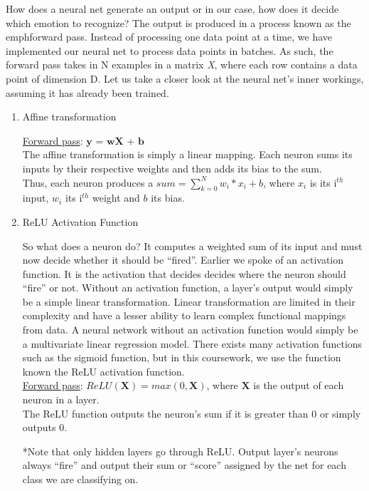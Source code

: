 How does a neural net generate an output or in our case, how does it decide which emotion to recognize?
The output is produced in a process known as the emph{forward pass}.
Instead of processing one data point at a time,
we have implemented our neural net to process data points in batches.
As such, the forward pass takes in N examples in a matrix \emph{X}, where each row contains a data point of dimension D.
Let us take a closer look at the neural net's inner workings, assuming it has already been trained.

\begin{enumerate}
   \item Affine transformation
  
     \underline{Forward pass}: $\textbf{y = wX + b}$\\
     The affine transformation is simply a linear mapping.
     Each neuron sums its inputs by their respective weights and then adds its bias to the sum.\\
     Thus, each neuron produces a $sum = \sum_{k=0}^{N} w_i * x_i + b$,
     where $x_i$ is its i$^{th}$ input, $w_i$ its i$^{th}$ weight and $b$ its bias.
     
   \item ReLU Activation Function
     
     So what does a neuron do? It computes a weighted sum of its input and must now decide whether it should be ``fired''.
     Earlier we spoke of an activation function.
     It is the activation that decides decides where the neuron should ``fire'' or not.
     Without an activation function, a layer's output would simply be a simple linear transformation.
     Linear transformation are limited in their complexity and have a lesser ability to learn complex functional mappings from data.
     A neural network without an activation function would simply be a multivariate linear regression model.
     There exists many activation functions such as the sigmoid function,
     but in this coursework, we use the function known the ReLU activation function.\\
     \underline{Forward pass}: $ReLU(\textbf{X}) = max(0,\textbf{X})$, where $\textbf{X}$ is the output of each neuron in a layer.\\
     The ReLU function outputs the neuron's sum if it is greater than 0 or simply outputs 0.
     
     *Note that only hidden layers go through ReLU.
     Output layer's neurons always ``fire'' and output their sum or ``score'' assigned by the net for each class we are classifying on.
     
\end{enumerate}
